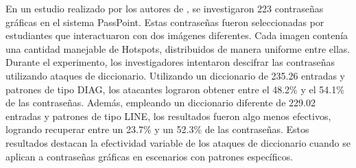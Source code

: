 \documentclass[12pt]{report}
\begin{document}
En un estudio realizado por los autores de \cite{21,22}, se investigaron 223 contraseñas gráficas en el sistema PassPoint. Estas contraseñas fueron seleccionadas por estudiantes que interactuaron con dos imágenes diferentes. Cada imagen contenía una cantidad manejable de Hotspots, distribuidos de manera uniforme entre ellas. Durante el experimento, los investigadores intentaron descifrar las contraseñas utilizando ataques de diccionario. Utilizando un diccionario de 235.26 entradas y patrones de tipo DIAG, los atacantes lograron obtener entre el 48.2\% y el 54.1\% de las contraseñas. Además, empleando un diccionario diferente de 229.02 entradas y patrones de tipo LINE, los resultados fueron algo menos efectivos, logrando recuperar entre un 23.7\% y un 52.3\% de las contraseñas. Estos resultados destacan la efectividad variable de los ataques de diccionario cuando se aplican a contraseñas gráficas en escenarios con patrones específicos.
\end{document}
